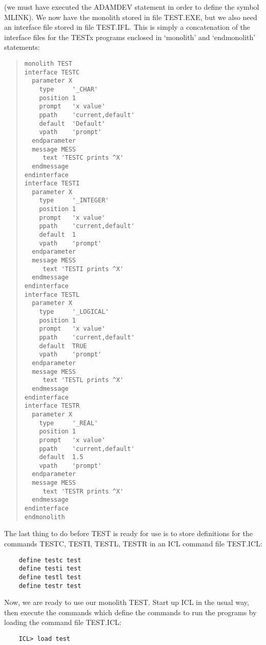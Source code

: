 (we must have executed the ADAMDEV statement in order to define the symbol
MLINK).
We now have the monolith stored in file TEST.EXE, but we also need an
interface file stored in file TEST.IFL.
This is simply a concatenation of the interface files for the TESTx programs
enclosed in `monolith' and `endmonolith' statements:
\begin{quote}

\begin{small}
\begin{verbatim}
monolith TEST
interface TESTC
  parameter X
    type     '_CHAR'
    position 1
    prompt   'x value'
    ppath    'current,default'
    default  'Default'
    vpath    'prompt'
  endparameter
  message MESS
     text 'TESTC prints ^X'
  endmessage
endinterface
interface TESTI
  parameter X
    type     '_INTEGER'
    position 1
    prompt   'x value'
    ppath    'current,default'
    default  1
    vpath    'prompt'
  endparameter
  message MESS
     text 'TESTI prints ^X'
  endmessage
endinterface
interface TESTL
  parameter X
    type     '_LOGICAL'
    position 1
    prompt   'x value'
    ppath    'current,default'
    default  TRUE
    vpath    'prompt'
  endparameter
  message MESS
     text 'TESTL prints ^X'
  endmessage
endinterface
interface TESTR
  parameter X
    type     '_REAL'
    position 1
    prompt   'x value'
    ppath    'current,default'
    default  1.5
    vpath    'prompt'
  endparameter
  message MESS
     text 'TESTR prints ^X'
  endmessage
endinterface
endmonolith
\end{verbatim}
\end{small}

\end{quote}
The last thing to do before TEST is ready for use is to store definitions for
the commands TESTC, TESTI, TESTL, TESTR in an ICL command file TEST.ICL:

\begin{small}
\begin{verbatim}
    define testc test
    define testi test
    define testl test
    define testr test
\end{verbatim}
\end{small}

Now, we are ready to use our monolith TEST.
Start up ICL in the usual way, then execute the commands which define the 
commands to run the programs by loading the command file TEST.ICL:

\begin{small}
\begin{verbatim}
    ICL> load test
\end{verbatim}
\end{small}

